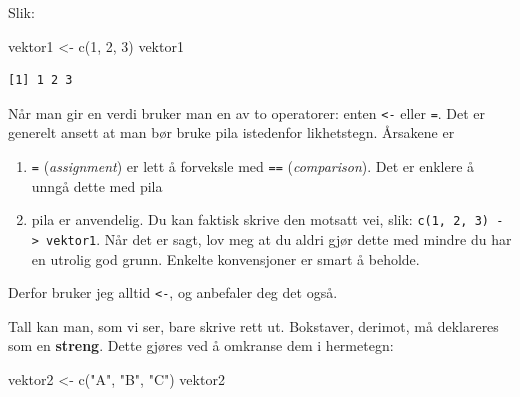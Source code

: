 \documentclass[
  letterpaper,
  DIV=11,
  numbers=noendperiod]{scrreprt}
\newenvironment{Shaded}{\begin{snugshade}}{\end{snugshade}}
\newcommand{\DecValTok}[1]{\textcolor[rgb]{0.68,0.00,0.00}{#1}}
\newcommand{\FunctionTok}[1]{\textcolor[rgb]{0.28,0.35,0.67}{#1}}
\newcommand{\NormalTok}[1]{\textcolor[rgb]{0.00,0.23,0.31}{#1}}
\newcommand{\OtherTok}[1]{\textcolor[rgb]{0.00,0.23,0.31}{#1}}
\newcommand{\StringTok}[1]{\textcolor[rgb]{0.13,0.47,0.30}{#1}}
\providecommand{\tightlist}{%
  \setlength{\itemsep}{0pt}\setlength{\parskip}{0pt}}\usepackage{longtable,booktabs,array}
\begin{document}
Slik:

\begin{Shaded}
\begin{Highlighting}[]
\NormalTok{vektor1 }\OtherTok{\textless{}{-}} \FunctionTok{c}\NormalTok{(}\DecValTok{1}\NormalTok{, }\DecValTok{2}\NormalTok{, }\DecValTok{3}\NormalTok{)}
\NormalTok{vektor1}
\end{Highlighting}
\end{Shaded}

\begin{verbatim}
[1] 1 2 3
\end{verbatim}

\begin{tcolorbox}[enhanced jigsaw, breakable, colframe=quarto-callout-note-color-frame, rightrule=.15mm, arc=.35mm, toprule=.15mm, bottomrule=.15mm, toptitle=1mm, colback=white, opacitybacktitle=0.6, left=2mm, titlerule=0mm, title=\textcolor{quarto-callout-note-color}{\faInfo}\hspace{0.5em}{Note}, colbacktitle=quarto-callout-note-color!10!white, bottomtitle=1mm, coltitle=black, leftrule=.75mm, opacityback=0]

Når man gir en verdi bruker man en av to operatorer: enten
\texttt{\textless{}-} eller \texttt{=}. Det er generelt ansett at man
bør bruke pila istedenfor likhetstegn. Årsakene er

\begin{enumerate}
\def\labelenumi{\arabic{enumi}.}
\tightlist
\item
  \texttt{=} (\emph{assignment}) er lett å forveksle med \texttt{==}
  (\emph{comparison}). Det er enklere å unngå dette med pila
\item
  pila er anvendelig. Du kan faktisk skrive den motsatt vei, slik:
  \texttt{c(1,\ 2,\ 3)\ -\textgreater{}\ vektor1}. Når det er sagt, lov
  meg at du aldri gjør dette med mindre du har en utrolig god grunn.
  Enkelte konvensjoner er smart å beholde.
\end{enumerate}

Derfor bruker jeg alltid \texttt{\textless{}-}, og anbefaler deg det
også.

\end{tcolorbox}

Tall kan man, som vi ser, bare skrive rett ut. Bokstaver, derimot, må
deklareres som en \textbf{streng}. Dette gjøres ved å omkranse dem i
hermetegn:

\begin{Shaded}
\begin{Highlighting}[]
\NormalTok{vektor2 }\OtherTok{\textless{}{-}} \FunctionTok{c}\NormalTok{(}\StringTok{"A"}\NormalTok{, }\StringTok{"B"}\NormalTok{, }\StringTok{"C"}\NormalTok{)}
\NormalTok{vektor2}
\end{Highlighting}
\end{Shaded}
\end{document}
